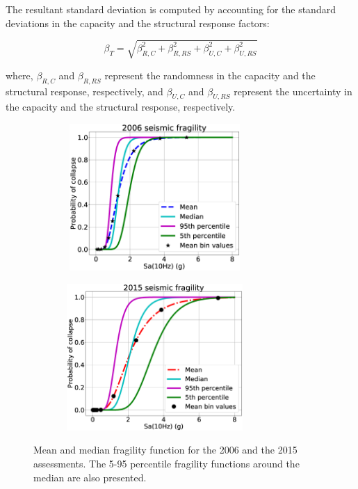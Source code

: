 \documentclass[3p]{elsarticle}
\begin{document}
The resultant standard deviation is computed by accounting for the standard deviations in the capacity and the structural response factors:

\begin{equation}
\label{eq4}
\beta_T = \sqrt{\beta_{R,C}^2 + \beta_{R,RS}^2 + \beta_{U,C}^2 + \beta_{U,RS}^2}
\end{equation}

\noindent where, $\beta_{R,C}$ and $\beta_{R,RS}$ represent the randomness in the capacity and the structural response, respectively, and $\beta_{U,C}$ and $\beta_{U,RS}$ represent the uncertainty in the capacity and the structural response, respectively.

\begin{figure}[h]
\begin{subfigure}{0.5\textwidth}
\centering
\includegraphics[width=2.8in, height=2.2in]{Fragility_2006.eps} 
\caption{}
\label{fig:fra1}
\end{subfigure}
\begin{subfigure}{0.5\textwidth}
\centering
\includegraphics[width=2.8in, height=2.2in]{Fragility_2015.eps} 
\caption{}
\label{fig:fra2}
\end{subfigure}
\caption{Mean and median fragility function for the 2006 and the 2015 assessments. The 5-95 percentile fragility functions around the median are also presented.}
\label{fig:fra}
\end{figure}
\end{document}
